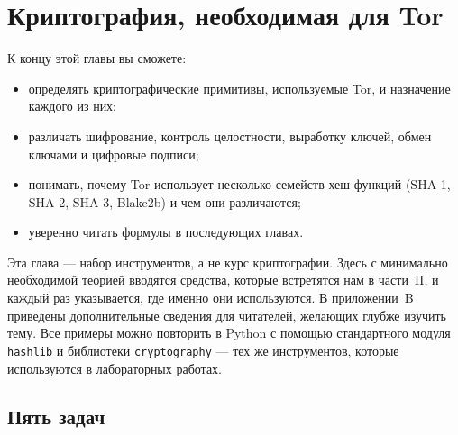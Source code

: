 \chapter{Криптография, необходимая для Tor}\label{cap:05-crittografia}

\begin{obiettivi}
К концу этой главы вы сможете:
\begin{itemize}[nosep]
  \item определять криптографические примитивы, используемые Tor, и назначение каждого из них;
  \item различать шифрование, контроль целостности, выработку ключей, обмен ключами и цифровые подписи;
  \item понимать, почему Tor использует несколько семейств хеш-функций (SHA-1, SHA-2, SHA-3, Blake2b) и чем они различаются;
  \item уверенно читать формулы в последующих главах.
\end{itemize}
\end{obiettivi}

Эта глава --- набор инструментов, а не курс криптографии. Здесь с минимально необходимой теорией вводятся средства, которые встретятся нам в части~II, и каждый раз указывается, где именно они используются. В приложении~B приведены дополнительные сведения для читателей, желающих глубже изучить тему. Все примеры можно повторить в Python с помощью стандартного модуля \texttt{hashlib} и библиотеки \texttt{cryptography} --- тех же инструментов, которые используются в лабораторных работах.

\section{Пять задач}\label{sec:cripto-compiti}


